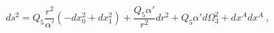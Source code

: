 \begin{equation}
 ds^2 = Q_5 \frac{r^2}{\alpha'} (- d x_0^2 + d x_1^2) 
       +  \frac{Q_5 \alpha'}{r^2} d r^2 + Q_5 \alpha' d\Omega_3^2 
       +  dx^A dx^A ~,
\end{equation}

